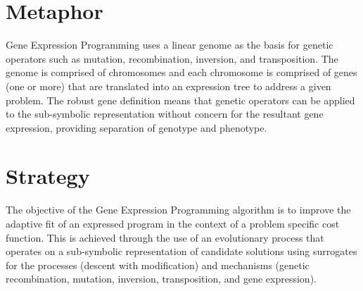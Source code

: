 \documentclass[a4paper, 11pt]{article}
\begin{document}

\section{Metaphor}
\label{sec:metaphor}
Gene Expression Programming uses a linear genome as the basis for genetic operators such as mutation, recombination, inversion, and transposition. The genome is comprised of chromosomes and each chromosome is comprised of genes (one or more) that are translated into an expression tree to address a given problem. The robust gene definition means that genetic operators can be applied to the sub-symbolic representation without concern for the resultant gene expression, providing separation of genotype and phenotype.

\section{Strategy}
\label{sec:strategy}
The objective of the Gene Expression Programming algorithm is to improve the adaptive fit of an expressed program in the context of a problem specific cost function.
This is achieved through the use of an evolutionary process that operates on a sub-symbolic representation of candidate solutions using surrogates for the processes (descent with modification) and mechanisms (genetic recombination, mutation, inversion, transposition, and gene expression).
\end{document}
